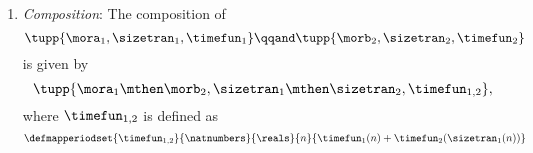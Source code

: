 \begin{definition}
\begin{enumerate}
        \item \emph{Composition}: The composition of
              \begin{equation}
                  \tupp{\mora_1, \sizetran_1,  \timefun_1  }
                  \qqand
                  \tupp{\morb_2, \sizetran_2,  \timefun_2  }
              \end{equation}
              is given by
              \begin{equation}
                  \tupp{
                      \mora_1 \mthen \morb_2,
                      \sizetran_1 \mthen \sizetran_2,
                      \timefun_{1,2}
                  },
              \end{equation}
              where $\timefun_{1,2}$ is defined as
              \begin{equation}
                  \label{eq:timefun-composition}
                  \defmapperiodset{
                      \timefun_{1,2}
                  }{
                      \natnumbers
                  }{
                      \reals
                  }{
                      n
                  }{
                      \timefun_1(n) + \timefun_2(\sizetran_1(n))
                  }
              \end{equation}
    \end{enumerate}
\end{definition}

